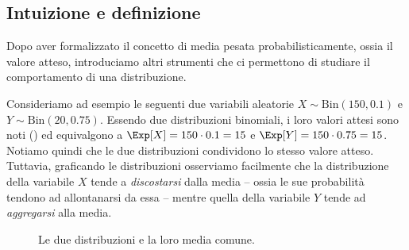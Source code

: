 \documentclass[a4paper, 12pt]{report}
\begin{document}
    \subsection{Intuizione e definizione}

    Dopo aver formalizzato il concetto di media pesata probabilisticamente, ossia il valore atteso, introduciamo altri strumenti che ci permettono di studiare il comportamento di una distribuzione.

    Consideriamo ad esempio le seguenti due variabili aleatorie $X \sim \mathrm{Bin}(150, 0.1)$ e $Y \sim \mathrm{Bin}(20, 0.75)$. Essendo due distribuzioni binomiali, i loro valori attesi sono noti () ed equivalgono a $\Exp[X] = 150 \cdot 0.1 = 15$ e $\Exp[Y] = 150 \cdot 0.75 = 15$. Notiamo quindi che le due distribuzioni condividono lo stesso valore atteso. Tuttavia, graficando le distribuzioni osserviamo facilmente che la distribuzione della variabile $X$ tende a \textit{discostarsi} dalla media -- ossia le sue probabilità tendono ad allontanarsi da essa -- mentre quella della variabile $Y$ tende ad \textit{aggregarsi} alla media.

    \begin{figure}[H]
        \centering

        \caption{Le due distribuzioni e la loro media comune.}
    \end{figure}
\end{document}
